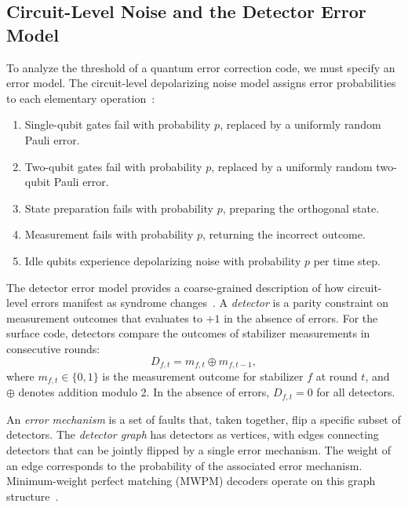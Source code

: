\documentclass[
    reprint,
    aps,
    prx,
    superscriptaddress,
    longbibliography
]{revtex4-2}
\begin{document}
\subsection{Circuit-Level Noise and the Detector Error Model}
\label{subsec:detector_error_model}

To analyze the threshold of a quantum error correction code, we must specify an error model. The circuit-level depolarizing noise model assigns error probabilities to each elementary operation~\cite{Fowler2012Surface, Stephens2014FaultTolerant}:
\begin{enumerate}[label=(\roman*)]
    \item Single-qubit gates fail with probability $p$, replaced by a uniformly random Pauli error.
    \item Two-qubit gates fail with probability $p$, replaced by a uniformly random two-qubit Pauli error.
    \item State preparation fails with probability $p$, preparing the orthogonal state.
    \item Measurement fails with probability $p$, returning the incorrect outcome.
    \item Idle qubits experience depolarizing noise with probability $p$ per time step.
\end{enumerate}

The detector error model provides a coarse-grained description of how circuit-level errors manifest as syndrome changes~\cite{Gidney2021Stim}. A \emph{detector} is a parity constraint on measurement outcomes that evaluates to $+1$ in the absence of errors. For the surface code, detectors compare the outcomes of stabilizer measurements in consecutive rounds:
\begin{equation}
    D_{f,t} = m_{f,t} \oplus m_{f,t-1},
\end{equation}
where $m_{f,t} \in \{0,1\}$ is the measurement outcome for stabilizer $f$ at round $t$, and $\oplus$ denotes addition modulo 2. In the absence of errors, $D_{f,t} = 0$ for all detectors.

An \emph{error mechanism} is a set of faults that, taken together, flip a specific subset of detectors. The \emph{detector graph} has detectors as vertices, with edges connecting detectors that can be jointly flipped by a single error mechanism. The weight of an edge corresponds to the probability of the associated error mechanism. Minimum-weight perfect matching (MWPM) decoders operate on this graph structure~\cite{Dennis2002Topological, Fowler2012Topological, Higgott2023Sparse}.
\end{document}
